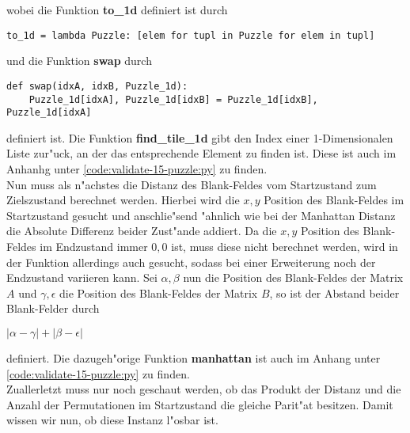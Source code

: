 wobei die Funktion \textbf{to\_1d} definiert ist durch
\vspace{.25cm}
\begin{verbatim}
to_1d = lambda Puzzle: [elem for tupl in Puzzle for elem in tupl]
\end{verbatim}
\vspace{.25cm}
und die Funktion \textbf{swap} durch
\vspace{.25cm}
\begin{verbatim}
def swap(idxA, idxB, Puzzle_1d):
    Puzzle_1d[idxA], Puzzle_1d[idxB] = Puzzle_1d[idxB], Puzzle_1d[idxA]
\end{verbatim}
\vspace{.25cm}
definiert ist.
Die Funktion \textbf{find\_tile\_1d} gibt den Index einer 1-Dimensionalen Liste zur"uck, an der das entsprechende Element zu finden ist. Diese ist auch im Anhanhg unter \ref{code:validate-15-puzzle:py} zu finden.\\
Nun muss als n"achstes die Distanz des Blank-Feldes vom Startzustand zum Zielszustand berechnet werden. Hierbei wird die $x,y$ Position des Blank-Feldes im Startzustand gesucht und anschlie"send "ahnlich wie bei der Manhattan Distanz die Absolute Differenz beider Zust"ande addiert. Da die $x,y$ Position des Blank-Feldes im Endzustand immer $0,0$ ist, muss diese nicht berechnet werden, wird in der Funktion allerdings auch gesucht, sodass bei einer Erweiterung noch der Endzustand variieren kann.
Sei $\alpha,\beta$ nun die Position des Blank-Feldes der Matrix $A$ und $\gamma,\epsilon$ die Position des Blank-Feldes der Matrix $B$, so ist der Abstand beider Blank-Felder durch \\
\begin{center}
    $\left | \alpha - \gamma \right | + \left | \beta - \epsilon \right |$
\end{center}
definiert.
Die dazugeh"orige Funktion \textbf{manhattan} ist auch im Anhang unter \ref{code:validate-15-puzzle:py} zu finden.\\
Zuallerletzt muss nur noch geschaut werden, ob das Produkt der Distanz und die Anzahl der Permutationen im Startzustand die gleiche Parit"at besitzen. Damit wissen wir nun, ob diese Instanz l"osbar ist.
